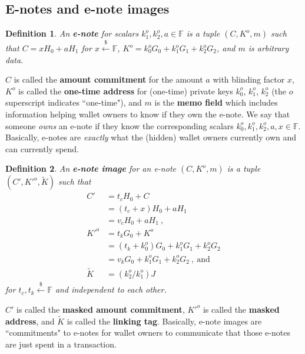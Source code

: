 \documentclass{article}
\theoremstyle{plain}
\newtheorem{definition}{Definition}[section]
\theoremstyle{remark}
\begin{document}
\subsection{E-notes and e-note images}
\begin{definition}\label{e-note}
An \textbf{\em e-note} for scalars $k_1^o, k_2^o, a \in\mathbb{F}$ is a tuple $(C, K^o, m)$ such that $C = x H_0 + a H_1$ for $x\xleftarrow{\$}\mathbb{F}$, $K^o = k_0^o G_0 + k_1^o G_1 + k_2^o G_2$, and $m$ is arbitrary data.
\end{definition}
$C$ is called the \textbf{amount commitment} for the amount $a$ with blinding factor $x$, $K^o$ is called the \textbf{one-time address} for (one-time) private keys $k_0^o$, $k_1^o$, $k_2^o$ (the $o$ superscript indicates ``one-time"), and $m$ is the \textbf{memo field} which includes information helping wallet owners to know if they own the e-note. We say that someone \textit{owns} an e-note if they know the corresponding scalars $k_0^o, k_1^o, k_2^o, a, x \in\mathbb{F}$. Basically, e-notes are \textit{exactly} what the (hidden) wallet owners currently own and can currently spend.

\begin{definition}\label{e-note-img}
An \textbf{\em e-note image} for an e-note $(C, K^o, m)$ is a tuple $(C', K'^o, \tilde{K})$ such that
\begin{align*}
C' &= t_c H_0 + C \\ &= (t_c+x) H_0 + a H_1 \\ &= v_c H_0 + a H_1 \ , \\
K'^o &= t_k G_0 + K^o \\ &= (t_k + k_0^o) G_0 + k_1^o G_1 + k_2^o G_2 \\ &= v_k G_0 + k_1^o G_1 + k_2^o G_2 \ ,\ \text{and} \\
\tilde{K} &= (k_2^o/k_1^o)J
\end{align*}
for $t_c, t_k \xleftarrow{\$}\mathbb{F}$ and independent to each other.
\end{definition}
$C'$ is called the \textbf{masked amount commitment}, $K'^o$ is called the \textbf{masked address}, and $\tilde{K}$ is called the \textbf{linking tag}. Basically, e-note images are ``commitments" to e-notes for wallet owners to communicate that those e-notes are just spent in a transaction.
\end{document}
